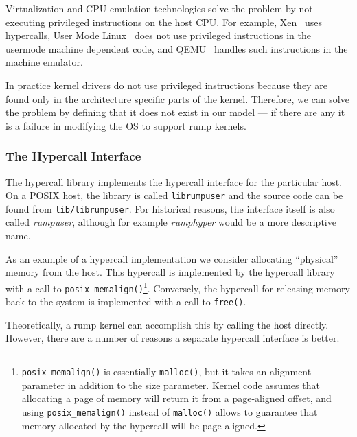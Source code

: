 Virtualization and CPU emulation technologies solve the problem by
not executing privileged instructions on the host CPU.
For example, Xen~\cite{barham:xen} uses hypercalls, User Mode
Linux~\cite{dike:uml} does not use privileged instructions in the
usermode machine dependent code, and QEMU~\cite{bellard:qemu}
handles such instructions in the machine emulator.

In practice kernel drivers do not use privileged instructions
because they are found only in the architecture specific parts of
the kernel.  Therefore, we can solve the problem by defining that
it does not exist in our model --- if there are any it is a failure
in modifying the OS to support rump kernels.

\subsubsection{The Hypercall Interface}
\label{sect:hypercall}

The hypercall library implements the hypercall interface for the
particular host.  On a POSIX host, the library is called
\texttt{librumpuser} and the source code can be found from
\texttt{lib/librumpuser}.  For historical reasons, the interface
itself is also called \textit{rumpuser}, although for example
\textit{rumphyper} would be a more descriptive name.

As an example of a hypercall implementation we consider allocating
``physical'' memory from the host.  This hypercall is implemented
by the hypercall library with a call to \verb+posix_memalign()+\footnote
{
	\texttt{posix\_memalign()} is essentially \texttt{malloc()}, but
	it takes an alignment parameter in addition to the size
	parameter.  Kernel code assumes that allocating a page of
	memory will return it from a page-aligned offset, and
	using \texttt{posix\_memalign()} instead of \texttt{malloc()}
	allows to guarantee that memory allocated by the hypercall
	will be page-aligned.
}.
Conversely, the hypercall for releasing memory back to the system
is implemented with a call to \verb+free()+.

Theoretically, a rump kernel can accomplish this by calling the host
directly.  However, there are a number of reasons a separate
hypercall interface is better.

